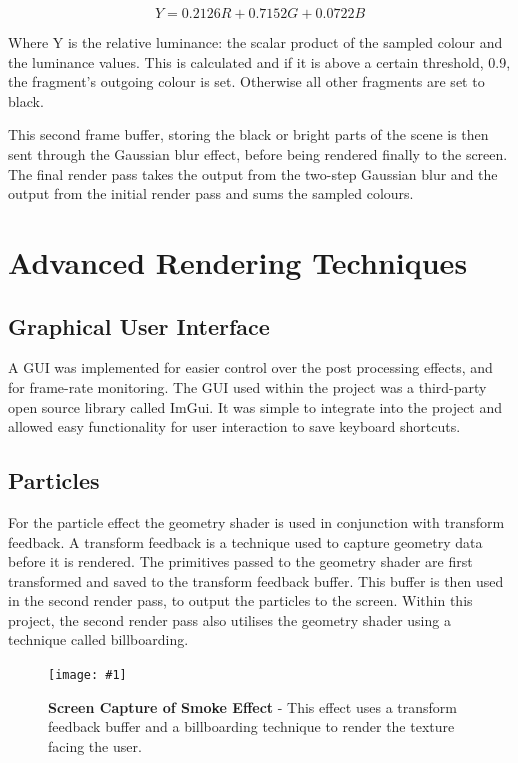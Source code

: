 \documentclass[conference]{acmsiggraph}
\newcommand{\figuremacroW}[4]{
\begin{figure}[h] %
	\centering
	\texttt{[image: \#1]}
	\caption[#2]{\textbf{#2} - #3}
	\label{fig:#1}
\end{figure}
}
\begin{document}
\begin{equation} \label{luma}
Y = 0.2126 R + 0.7152 G + 0.0722 B
\end{equation}

Where Y is the relative luminance: the scalar product of the sampled colour and the luminance values. This is calculated and if it is above a certain threshold, 0.9, the fragment's outgoing colour is set. Otherwise all other fragments are set to black.

This second frame buffer, storing the black or bright parts of the scene is then sent through the Gaussian blur effect, before being rendered finally to the screen. The final render pass takes the output from the two-step Gaussian blur and the output from the initial render pass and sums the sampled colours.


\section{Advanced Rendering Techniques}
	
\subsection{Graphical User Interface}
A GUI was implemented for easier control over the post processing effects, and for frame-rate monitoring. The GUI used within the project was a third-party open source library called ImGui. \cite{imgui} It was simple to integrate into the project and allowed easy functionality for user interaction to save keyboard shortcuts. 
	
\subsection{Particles}

For the particle effect the geometry shader is used in conjunction with transform feedback. A transform feedback is a technique used to capture geometry data before it is rendered. The primitives passed to the geometry shader are first transformed and saved to the transform feedback buffer. This buffer is then used in the second render pass, to output the particles to the screen. Within this project, the second render pass also utilises the geometry shader using a technique called billboarding.

\figuremacroW
{billboards}
{Screen Capture of Smoke Effect}
{This effect uses a transform feedback buffer and a billboarding technique to render the texture facing the user.}
{1.0}
\end{document}
